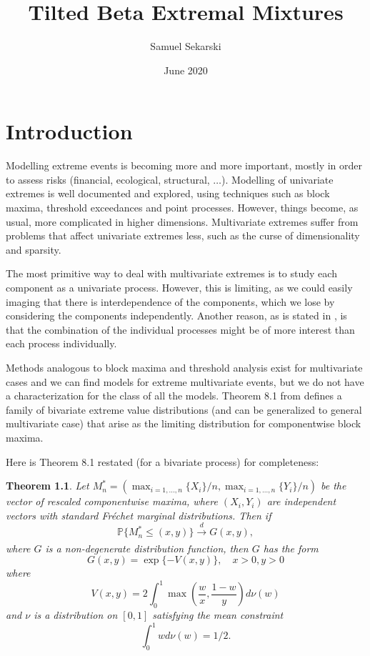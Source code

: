 \documentclass[10pt]{report}
\title{Tilted Beta Extremal Mixtures}
\author{Samuel Sekarski}
\date{June 2020}
\newtheorem{theorem}{Theorem}
\begin{document}
\maketitle



\tableofcontents
\listoffigures

\chapter{Introduction}
\label{sec:intro}

Modelling extreme events is becoming more and more important, mostly in order to assess risks (financial, ecological, structural, $\ldots$). Modelling of univariate extremes is well documented and explored, using techniques such as block maxima, threshold exceedances and point processes.
However, things become, as usual, more complicated in higher dimensions. Multivariate extremes suffer from problems that affect univariate extremes less, such as the curse of dimensionality and sparsity.

The most primitive way to deal with multivariate extremes is to study each component as a univariate process. However, this is limiting, as we could easily imaging that there is interdependence of the components, which we lose by considering the components independently. Another reason, as is stated in \cite{Coles}, is that the combination of the individual processes might be of more interest than each process individually.

Methods analogous to block maxima and threshold analysis exist for multivariate cases and we can find models for extreme multivariate events, but we do not have a characterization for the class of all the models. Theorem 8.1 from \cite{Coles} defines a family of bivariate extreme value distributions (and can be generalized to general multivariate case) that arise as the limiting distribution for componentwise block maxima. 

Here is Theorem 8.1 restated (for a bivariate process) for completeness:

\begin{theorem}

Let $M^*_n = (\max_{i=1,...,n} \{X_i\}/n, \max_{i=1,...,n} \{Y_i\}/n)$ be the vector of rescaled componentwise maxima, where $(X_i,Y_i)$ are independent vectors with standard Fréchet marginal distributions. Then if
$$
\mathbb{P}\{M^*_n \leq (x,y) \} \xrightarrow[]{d} G(x,y),
$$
where $G$ is a non-degenerate distribution function, then $G$ has the form
$$
G(x,y) = \exp\{-V(x,y)\}, \quad x>0, y>0
$$
where
$$
V(x,y) = 2 \int^1_0 \max \left(\frac{w}{x},\frac{1-w}{y}\right)d\nu(w)
$$
and $\nu$ is a distribution on $[0,1]$ satisfying the mean constraint
$$
\int_0^1 wd\nu(w) = 1/2.
$$


\end{theorem}
\end{document}
